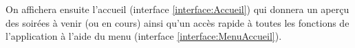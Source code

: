 \documentclass[a4paper, 12pt, notitlepage]{article} %
\begin{document}
On affichera ensuite l'accueil (interface \ref{interface:Accueil}) qui donnera un aperçu des soirées à venir (ou en cours) ainsi qu'un accès rapide à toutes les fonctions de l’application à l'aide du menu (interface \ref{interface:MenuAccueil}).

\vfill
\begin{figure}[!htb]
    \centering
    \hfill
    \hfill
\end{figure}
\end{document}
